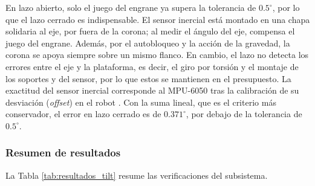 \documentclass[../../General.tex]{subfiles}
\begin{document}
En lazo abierto, solo el juego del engrane ya supera la tolerancia de $0.5^\circ$, por lo que el lazo cerrado es indispensable. El sensor inercial está montado en una chapa solidaria al eje, por fuera de la corona; al medir el ángulo del eje, compensa el juego del engrane. Además, por el autobloqueo y la acción de la gravedad, la corona se apoya siempre sobre un mismo flanco. En cambio, el lazo no detecta los errores entre el eje y la plataforma, es decir, el giro por torsión y el montaje de los soportes y del sensor, por lo que estos se mantienen en el presupuesto. La exactitud del sensor inercial corresponde al MPU-6050 tras la calibración de su desviación (\textit{offset}) en el robot \citep{invensense_mpu6050}. Con la suma lineal, que es el criterio más conservador, el error en lazo cerrado es de $0.371^\circ$, por debajo de la tolerancia de $0.5^\circ$.

\subsubsection{Resumen de resultados}

La Tabla \ref{tab:resultados_tilt} resume las verificaciones del subsistema.
\end{document}
